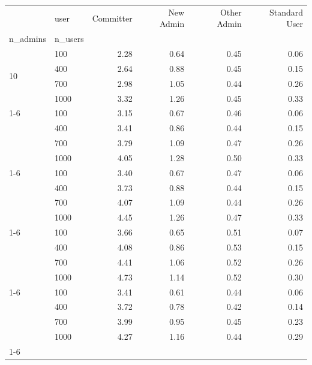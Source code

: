 \begin{tabular}{llrrrr}
\toprule
 & user & Committer & New Admin & Other Admin & Standard User \\
n_admins & n_users &  &  &  &  \\
\midrule
\multirow[t]{4}{*}{10} & 100 & 2.28 & 0.64 & 0.45 & 0.06 \\
                        & 400 & 2.64 & 0.88 & 0.45 & 0.15 \\
                        & 700 & 2.98 & 1.05 & 0.44 & 0.26 \\
                        & 1000 & 3.32 & 1.26 & 0.45 & 0.33 \\
\cline{1-6}
\multirow[t]{4}{*}{50} & 100 & 3.15 & 0.67 & 0.46 & 0.06 \\
                        & 400 & 3.41 & 0.86 & 0.44 & 0.15 \\
                        & 700 & 3.79 & 1.09 & 0.47 & 0.26 \\
                        & 1000 & 4.05 & 1.28 & 0.50 & 0.33 \\
\cline{1-6}
\multirow[t]{4}{*}{100} & 100 & 3.40 & 0.67 & 0.47 & 0.06 \\
                        & 400 & 3.73 & 0.88 & 0.44 & 0.15 \\
                        & 700 & 4.07 & 1.09 & 0.44 & 0.26 \\
                        & 1000 & 4.45 & 1.26 & 0.47 & 0.33 \\
\cline{1-6}
\multirow[t]{4}{*}{150} & 100 & 3.66 & 0.65 & 0.51 & 0.07 \\
                        & 400 & 4.08 & 0.86 & 0.53 & 0.15 \\
                        & 700 & 4.41 & 1.06 & 0.52 & 0.26 \\
                        & 1000 & 4.73 & 1.14 & 0.52 & 0.30 \\
\cline{1-6}
\multirow[t]{4}{*}{200} & 100 & 3.41 & 0.61 & 0.44 & 0.06 \\
                        & 400 & 3.72 & 0.78 & 0.42 & 0.14 \\
                        & 700 & 3.99 & 0.95 & 0.45 & 0.23 \\
                        & 1000 & 4.27 & 1.16 & 0.44 & 0.29 \\
\cline{1-6}
\bottomrule
\end{tabular}
